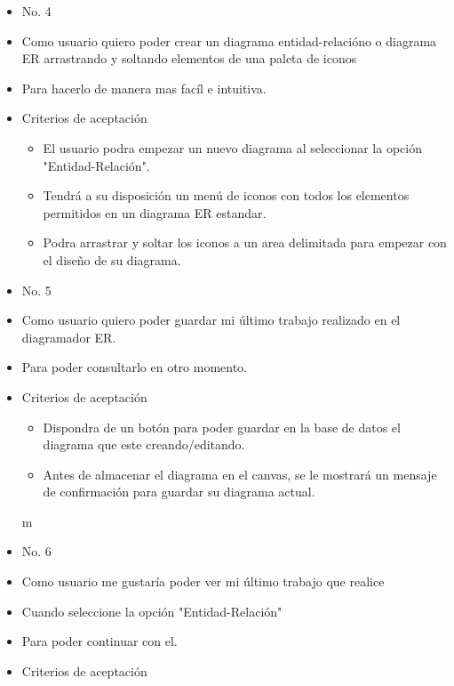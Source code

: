 \begin{itemize}
	\item No. 4
	\item Como usuario quiero poder crear un diagrama entidad-relacióno o diagrama ER arrastrando y soltando elementos de una paleta de iconos
	\item Para hacerlo de manera mas facíl e intuitiva.
	\item Criterios de aceptación
	\begin{itemize}
		\item El usuario podra empezar un nuevo diagrama al seleccionar la opción "Entidad-Relación".
		\item Tendrá a su disposición un menú de iconos con todos los elementos permitidos en un diagrama ER estandar.
		\item Podra arrastrar y soltar los iconos a un area delimitada para empezar con el diseño de su diagrama.
	\end{itemize}
\end{itemize}

\begin{itemize}
	\item No. 5
	\item Como usuario quiero poder guardar mi último trabajo realizado en el diagramador ER.
	\item Para poder consultarlo en otro momento.
	\item Criterios de aceptación
	\begin{itemize}
		\item Dispondra de un botón para poder guardar en la base de datos el diagrama que este creando/editando.
		\item Antes de almacenar el diagrama en el canvas, se le mostrará un mensaje de confirmación para guardar su diagrama actual.
	\end{itemize}m
\end{itemize}

\begin{itemize}
	\item No. 6
	\item Como usuario me gustaría poder ver mi último trabajo que realice
	\item Cuando seleccione la opción "Entidad-Relación"
	\item Para poder continuar con el.
	\item Criterios de aceptación
\end{itemize}

